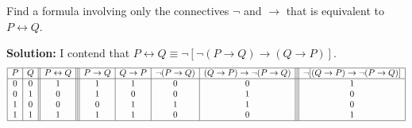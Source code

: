 Find a formula involving only the connectives $\neg$ and $\rightarrow$ that is equivalent to $P \leftrightarrow Q$.

\textbf{Solution:} I contend that $P \leftrightarrow Q \equiv \neg [\neg (P \rightarrow Q) \rightarrow (Q \rightarrow P)]$.
    \[
    \begin{array}{|c|c||c|||c|c|c|c|||c|}
    \hline
    P & Q & P \leftrightarrow Q & P \rightarrow Q & Q \rightarrow P & \neg (P \rightarrow Q) & (Q \rightarrow P) \rightarrow \neg (P \rightarrow Q) & \neg [(Q \rightarrow P) \rightarrow \neg (P \rightarrow Q)]\\
    \hline
    0 & 0 & 1 & 1 & 1 & 0 & 0 & 1\\
    0 & 1 & 0 & 1 & 0 & 0 & 1 & 0\\
    1 & 0 & 0 & 0 & 1 & 1 & 1 & 0\\
    1 & 1 & 1 & 1 & 1 & 0 & 0 & 1\\
    \hline
    \end{array}
    \]
\pagebreak